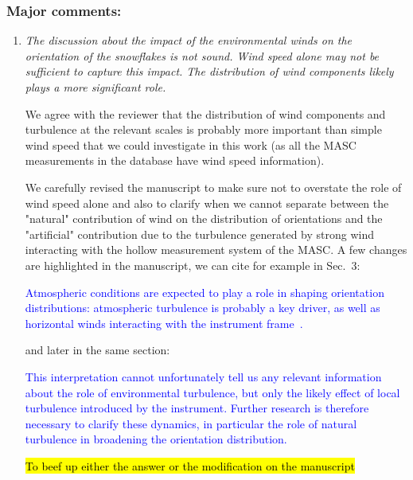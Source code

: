 \documentclass[12pt]{article}
\newcommand*{\blue}{\textcolor{blue}}
\begin{document}
\subsubsection*{Major comments:}
\begin{enumerate}
    \item \textit{The discussion about the impact of the environmental winds on the orientation of the snowflakes is not sound. Wind speed alone may not be sufficient to capture this impact. The distribution of wind components likely plays a more significant role.}

    We agree with the reviewer that the distribution of wind components and turbulence at the relevant scales is probably more important than simple wind speed that we could investigate in this work (as all the MASC measurements in the database have wind speed information).
    
    We carefully revised the manuscript to make sure not to overstate the role of wind speed alone and also to clarify when we cannot separate between the "natural" contribution of wind on the distribution of orientations and the "artificial" contribution due to the turbulence generated by strong wind interacting with the hollow measurement system of the MASC. A few changes are highlighted in the manuscript, we can cite for example in Sec.~3:

    \blue{Atmospheric conditions are expected to play a role in shaping orientation distributions: atmospheric turbulence is probably a key driver, as well as horizontal winds interacting with the instrument frame~\cite{Fitch_AMT_2021}. }

    and later in the same section:

    \blue{This interpretation cannot unfortunately tell us any relevant information about the role of environmental turbulence, but only the likely effect of local turbulence introduced by the instrument.  Further research is therefore necessary to clarify these dynamics, in particular the role of natural turbulence in broadening the orientation distribution.}

    \hl{To beef up either the answer or the modification on the manuscript}

    
    
\end{enumerate}
\end{document}
